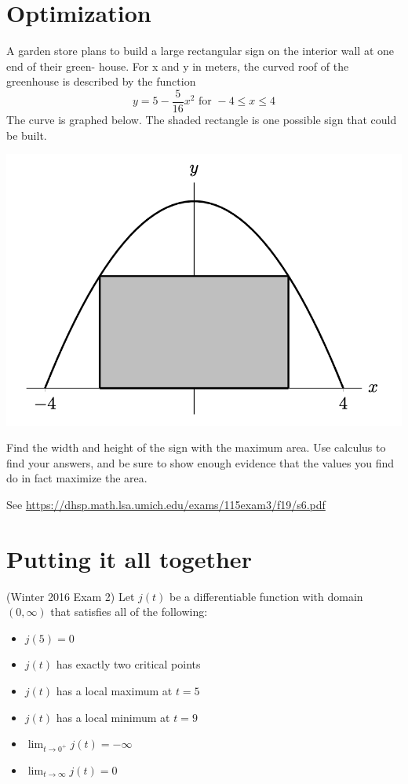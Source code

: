 \documentclass[11pt]{exam}
\begin{document}
\begin{questions}
\section*{Optimization}
\vspace{-0.25in}
\question A garden store plans to build a large rectangular
sign on the interior wall at one end of their green-
house. For x and y in meters, the curved roof of the
greenhouse is described by the function \[
  y = 5 - \frac{5}{16} x^2 \text{ for } -4 \leq x \leq 4
\]
The curve is graphed below. The shaded rectangle is one possible sign
that could be built.
\begin{center}
  \includegraphics[scale=0.5]{Figures/greenhouse}
\end{center}

Find the width and height of the sign with the maximum area. Use
calculus to find your answers, and be sure to show enough evidence
that the values you find do in fact maximize the area.
\begin{solution}
  See \href{https://dhsp.math.lsa.umich.edu/exams/115exam3/f19/s6.pdf}{https://dhsp.math.lsa.umich.edu/exams/115exam3/f19/s6.pdf}
\end{solution}
\section*{Putting it all together}
\question (Winter 2016 Exam 2) %
Let \(j(t)\) be a differentiable function with domain \((0, \infty)\) that satisfies all of the following:
\begin{itemize}
\item \(j(5) = 0\)
\item \(j(t)\) has exactly two critical points
\item \(j(t)\) has a
  local maximum at \(t = 5\)
\item \(j(t)\) has a local minimum at \(t = 9\)
\item \(\lim_{t \to 0^+} j(t) = -\infty\)
\item \(\lim_{t \to \infty} j(t) = 0\)
\end{itemize}
\begin{parts}

\end{parts}
\end{questions}
\end{document}
